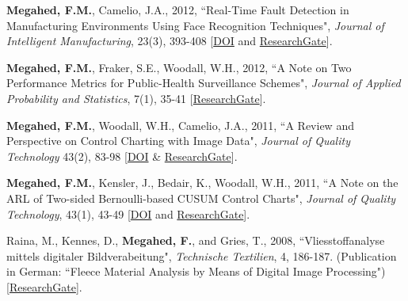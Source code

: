 \documentclass[margin,line]{res}
\begin{document}
\begin{resume}
\vspace{-1.5mm}
\textbf{Megahed, F.M.}, Camelio, J.A., 2012, ``Real-Time Fault Detection in Manufacturing Environments Using Face Recognition Techniques", \textit{Journal of Intelligent Manufacturing}, 23(3), 393-408 [\faFile*\href{https://doi.org/10.1007/s10845-010-0378-3}{DOI} and \faResearchgate \href{https://www.researchgate.net/publication/225740685_Real-time_fault_detection_in_manufacturing_environments_using_face_recognition_techniques}{ResearchGate}].

\vspace{-1.5mm}
\textbf{Megahed, F.M.}, Fraker, S.E., Woodall, W.H., 2012, ``A Note on Two Performance Metrics for Public-Health Surveillance Schemes", \textit{Journal of Applied Probability and Statistics}, 7(1), 35-41 [\faResearchgate \href{https://www.researchgate.net/profile/Fadel_Megahed/publication/287597513_A_note_on_two_performance_metrics_for_public_health_surveillance_schemes/links/5c40b09392851c22a37c47a7/A-note-on-two-performance-metrics-for-public-health-surveillance-schemes.pdf}{ResearchGate}].

\vspace{-1.5mm}
\textbf{Megahed, F.M.}, Woodall, W.H., Camelio, J.A., 2011, ``A Review and Perspective on Control Charting with Image Data", \textit{Journal of Quality Technology} 43(2), 83-98 [\faFile*\href{https://doi.org/10.1080/00224065.2011.11917848}{DOI} \& \faResearchgate \href{https://www.researchgate.net/publication/258566049_A_Review_and_Perspective_on_Control_Charting_with_Image_Data}{ResearchGate}].

\vspace{-1.5mm}
\textbf{Megahed, F.M.}, Kensler, J., Bedair, K., Woodall, W.H., 2011, ``A Note on the ARL of Two-sided Bernoulli-based CUSUM Control Charts", \textit{Journal of Quality Technology}, 43(1), 43-49 [\faFile*\href{https://doi.org/10.1080/00224065.2011.11917844}{DOI} and \faResearchgate \href{https://www.researchgate.net/publication/258566145_A_note_on_the_ARL_of_two-sided_Bernoulli-based_CUSUM_control_charts}{ResearchGate}].

\vspace{-1.5mm}
Raina, M., Kennes, D., \textbf{Megahed, F.}, and Gries, T., 2008, ``Vliesstoffanalyse mittels digitaler Bildverabeitung", \textit{Technische Textilien}, 4, 186-187. (Publication in German: ``Fleece Material Analysis by Means of Digital Image Processing") [\faResearchgate \href{https://www.researchgate.net/publication/281647968_Statistical_Learning_Methods_Applied_to_Process_Monitoring_An_Overview_and_Perspective}{ResearchGate}].


\end{resume}
\end{document}
